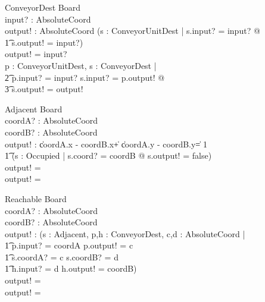 \documentclass[12pt]{article}
\begin{document}
\begin{schema}{ConveyorDest}
\Xi Board \\
input? : AbsoluteCoord \\
output! : AbsoluteCoord
\where
\IF (\exists s : ConveyorUnitDest | s.input? = input? @ \\ \t1 s.output! = input?) \\
\THEN output! = input? \\
\ELSE \exists p : ConveyorUnitDest, s : ConveyorDest | \\ \t2 p.input? = input? \wedge s.input? = p.output! @ \\ \t3 s.output! = output!
\end{schema}

\begin{schema}{Adjacent}
\Xi Board \\
coordA? : AbsoluteCoord \\
coordB? : AbsoluteCoord \\
output! : \bool
\where
\IF \|coordA.x - coordB.x\| + \|coordA.y - coordB.y\| = 1 \\ \t1
(\exists s : Occupied | s.coord? = coordB @ s.output! = false) \\
\THEN output! = \true \\
\ELSE output! = \false
\end{schema}

\begin{schema}{Reachable}
\Xi Board \\
coordA? : AbsoluteCoord \\
coordB? : AbsoluteCoord \\
output! : \bool
\where
\IF (\exists s : Adjacent, p,h : ConveyorDest, c,d : AbsoluteCoord | \\ \t1
    p.input? = coordA \wedge p.output! = c \\ \t1
    s.coordA? = c \wedge s.coordB? = d \\ \t1
    h.input? = d \wedge h.output! = coordB) \\
\THEN output! = \true \\
\ELSE output! = \false
\end{schema}
\end{document}
